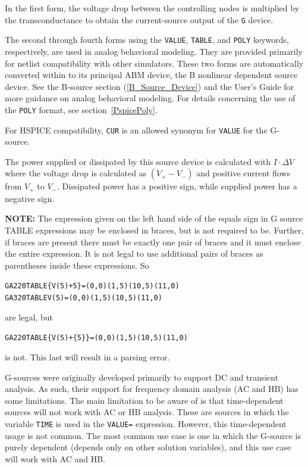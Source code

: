 \begin{Device}
\begin{Parameters}
\end{Parameters}

\comments

In the first form, the voltage drop between the controlling nodes is
multiplied by the transconductance to obtain the current-source
output of the \texttt{G} device. 

The second through fourth forms using the \texttt{VALUE}, \texttt{TABLE}, and
\texttt{POLY} keywords, respectively, are used in analog behavioral modeling.
They are provided primarily for netlist compatibility with other simulators.
These two forms are automatically converted within \Xyce{} to its principal ABM
device, the B nonlinear dependent source device. See the B-source section
(\ref{B_Source_Device}) and the \Xyce{} User's Guide for more guidance on
analog behavioral modeling.  For details concerning the use of the
\texttt{POLY} format, see section~\ref{PspicePoly}.

For HSPICE compatibility, \texttt{CUR} is an allowed synonym for
\texttt{VALUE} for the G-source.

The power supplied or dissipated by this source device is calculated 
with $I \cdot \Delta V$ where the voltage drop is calculated as $(V_+ - V_-)$ 
and positive current flows from $V_+$ to $V_-$.  Dissipated power has a
positive sign, while supplied power has a negative sign.

{\bf NOTE:} The expression given on the left hand side of the equals
sign in G source TABLE expressions may be enclosed in braces, but is
not required to be.  Further, if braces are present there must be
exactly one pair of braces and it must enclose the entire expression.
It is not legal to use additional pairs of braces as parentheses
inside these expressions.  So
\begin{alltt}
GA2 2 0 TABLE \{V(5)+5\} = (0,0) (1,5) (10,5) (11,0)
GA3 2 0 TABLE V(5) = (0,0) (1,5) (10,5) (11,0)
\end{alltt}
are legal, but
\begin{alltt}
GA2 2 0 TABLE \{V(5)+\{5\}\} = (0,0) (1,5) (10,5) (11,0)
\end{alltt}
is not.  This last will result in a parsing error.

G-sources were originally developed primarily to support DC and transient analysis.  
As such, their support for frequency domain analysis (AC and HB) has some limitations.  
The main limitation to be aware of is that time-dependent sources will not work with AC or HB analysis.  
These are sources in which the variable \texttt{TIME} is used in the \texttt{VALUE=} expression. 
However, this time-dependent usage is not common.  The most 
common use case is one in which the G-source is purely dependent (depends only 
on other solution variables), and this use case will work with AC and HB.  
\end{Device}

